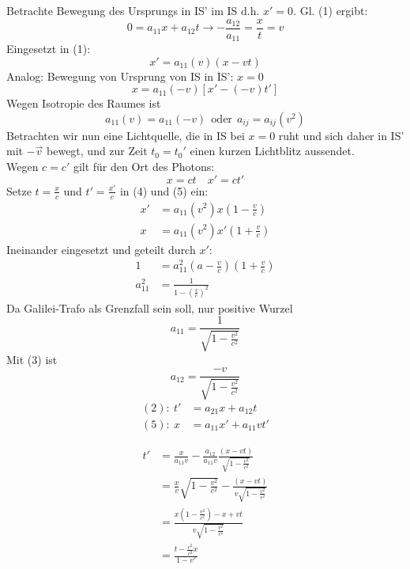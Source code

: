 \documentclass[titlepage,12pt,a4paper,ngerman]{report}
\newcommand{\tx}[1]{\textrm{#1}}
\begin{document}
{Betrachte Bewegung des Ursprungs in IS' im IS d.h. $ x' = 0 $. Gl. (1) ergibt:
\begin{equation*}
0 = a_{11} x + a_{12} t \rightarrow - \frac{a_{12}}{a_{11}} = \frac{x}{t} = v \tag{3}
\end{equation*}
Eingesetzt in (1):
\begin{equation*}
x' = a_{11}(v) (x-vt) \tag{4}
\end{equation*}
Analog: Bewegung von Ursprung von IS in IS': $ x = 0 $
\begin{equation*}
x = a_{11}(-v) [x' - (-v) t'] \tag{5}
\end{equation*}
Wegen Isotropie des Raumes ist
\begin{equation*}
a_{11}(v) = a_{11}(-v) \ \ \tx{oder} \ \ a_{ij} = a_{ij}(v^2)
\end{equation*}
Betrachten wir nun eine Lichtquelle, die in IS bei $ x=0 $ ruht und sich daher in IS' mit $ -\vec{v} $ bewegt, und zur Zeit $ t_0 = t_0' $ einen kurzen Lichtblitz aussendet.\\
Wegen $ c = c' $ gilt für den Ort des Photons:
\begin{equation*}
x = ct \quad x' = ct' \tag{6}
\end{equation*}
Setze $ t = \frac{x}{c} $ und $ t' = \frac{x'}{c} $ in (4) und (5) ein:
\begin{align*}
x' &= a_{11}(v^2) x(1-\frac{v}{c}) \tag{7} \\
x &= a_{11}(v^2) x'(1+\frac{v}{c}) \tag{7}
\end{align*}
Ineinander eingesetzt und geteilt durch $ x' $:
\begin{align}
1 &= a_{11}^2 (a-\frac{v}{c}) (1+\frac{v}{c})\\
a_{11}^2 &= \frac{1}{1-(\frac{v}{c})^2}
\end{align}
Da Galilei-Trafo als Grenzfall sein soll, nur positive Wurzel
\begin{equation*}
a_{11} = \frac{1}{\sqrt{1 - \frac{v^2}{c^2}}} \tag{8}
\end{equation*}
Mit (3) ist $$a_{12} = \frac{-v}{\sqrt{1 - \frac{v^2}{c^2}}}$$
\begin{align*}
(2):\ t' &= a_{21} x + a_{12} t\\
(5):\ x &= a_{11} x' + a_{11} v t'
\end{align*}





\begin{align*}
t' &= \frac{x}{a_{11} v} - \frac{a_{12}}{a_{11} v} \frac{(x-vt)}{\sqrt{1-\frac{v^2}{c^2}}}\\
&= \frac{x}{v} \sqrt{1-\frac{v^2}{c^2}} - \frac{(x-vt)}{v \sqrt{1-\frac{v^2}{c^2}}}\\
&= \frac{x (1-\frac{v^2}{c^2}) - x + vt}{v \sqrt{1-\frac{v^2}{c^2}}}\\
&= \frac{t - \frac{v^2}{c^2} x}{1 - v'}
\end{align*}

}
\end{document}
